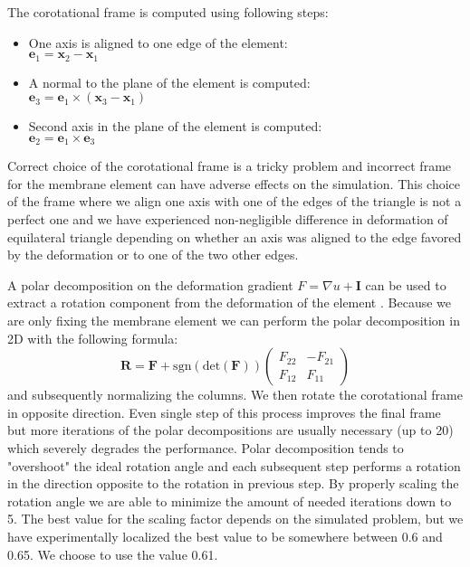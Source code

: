 \documentclass{egpubl}
\newcommand{\mat}[1]{\mathbf{#1}}
\begin{document}
The corotational frame is computed using following steps: 

\begin{itemize}
    \item One axis is aligned to one edge of the element:\\
    $\mathbf{e}_1 = \mathbf{x}_2 - \mathbf{x}_1$
    \item A normal to the plane of the element is computed:\\
    $\mathbf{e}_3 = \mathbf{e}_1 \times (\mathbf{x}_3 - \mathbf{x}_1)$
    \item Second axis in the plane of the element is computed:\\
    $\mathbf{e}_2 = \mathbf{e}_1 \times \mathbf{e}_3$
\end{itemize}

Correct choice of the corotational frame is a tricky
problem \cite{Felippa2005} and incorrect frame for the membrane element can
have adverse effects on the simulation.
This choice of the frame where we align one axis with one of the edges
of the triangle is not a perfect one and we have experienced
non-negligible difference in deformation of equilateral triangle depending
on whether an axis was aligned to the edge favored by the deformation or to
one of the two other edges.

A polar decomposition on the deformation gradient $F = \nabla u
+ \mat{I}$ can be used to extract a rotation component from the deformation of
the element \cite{Ciarlet1994,Hauth2004}. Because we are only fixing the membrane
element we can perform the polar decomposition in 2D with the following
formula:
%
\begin{equation}
    \mat{R} = \mat{F} + \mathrm{sgn}(\mathrm{det}(\mat{F})) \begin{pmatrix}
        F_{22} & - F_{21} \\
        F_{12} & F_{11}
    \end{pmatrix}
\end{equation}
%
and subsequently normalizing the columns. We then rotate the corotational
frame in opposite direction. Even single step of this process improves the
final frame but more iterations of the polar decompositions are usually
necessary (up to 20) which severely degrades the performance. Polar
decomposition tends to "overshoot" the ideal rotation angle and each
subsequent step performs a rotation in the direction opposite to the rotation in previous step. By properly
scaling the rotation angle we are able to minimize the amount of needed
iterations down to 5. The best value for the scaling factor depends on the
simulated problem, but we have experimentally localized the best value to
be somewhere between 0.6 and 0.65. We choose to use the value 0.61.
\end{document}
